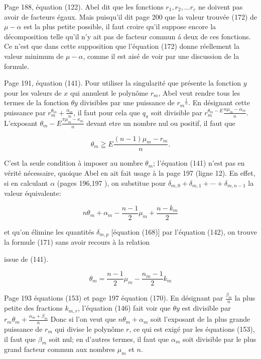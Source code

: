\documentclass{article}
\begin{document}
Page 188, équation (122). Abel dit que les fonctions \(r_{1}, r_{2}, \ldots r_{\varepsilon}\) ne doivent pas avoir de facteurs égaux. Mais puisqu'il dit page 200 que la valeur trouvée (172) de \(\mu-\alpha\) est la plus petite possible, il faut croire qu'il suppose encore la décomposition telle
qu'il n'y ait pas de facteur commun á deux de ces fonctions. Ce n'est que dans cette supposition que l'équation (172) donne réellement la valeur minimum de \(\mu-\alpha\), comme il est aisé de voir par une discussion de la formule.

Page 191, équation (141). Pour utiliser la singularité que présente la fonction \(y\) pour les valeurs de \(x\) qui annulent le polynôme \(r_{m}\), Abel veut rendre tous les termes de la fonction \(\theta y\) divisibles par une puissance de \(r_{m}{ }^{\frac{1}{n}}\). En désignant cette puissance par \(r_{m}^{\theta_{i n}}+\frac{\alpha_{m}}{n}\), il faut pour cela que \(q_{\pi}\) soit divisible par \(r_{m}^{\theta_{m}-E} \frac{n \mu_{m}-\alpha_{m}}{n}\). L'exposant \(\theta_{m}-E \frac{\pi \mu_{m}-\kappa_{m}}{n}\) devant etre un nombre nul ou positif, il faut que

\[
\theta_{m} \geqq E \frac{(n-1) \mu_{m}-r_{m}}{n} .
\]

C'est la seule condition à imposer au nombre \(\theta_{m}\); l'équation (141) n'est pas en vérité nécessaire, quoique Abel en ait fait usage à la page 197 (ligne 12). En effet, si en calculant \(\alpha\) (pages 196,197 ), on substitue pour \(\delta_{m, 0}+\delta_{m, 1}+\cdots+\delta_{m, n-1}\) la valeur équivalente:

\[
n \theta_{m}+\alpha_{m}-\frac{n-1}{2} \mu_{m}+\frac{n-k_{m}}{2}
\]

et qu'on élimine les quantités \(\delta_{m, p}\) [équation (168)] par l'équation (142), on trouve la formule (171) sans avoir recours à la relation

issue de (141).

\[
\theta_{m}=\frac{n-1}{2} \mu_{m}-\frac{n_{m}-1}{2} k_{m}
\]

Page 193 équations (153) et page 197 équation (170). En désignant par \(\frac{\beta_{m}}{n}\) la plus petite des fractions \(k_{m, r}\), l'équation (146) fait voir que \(\theta y\) est divisible par \(r_{m} \theta_{m}+\frac{\alpha_{m}+\beta_{m}}{n}\) Donc si l'on veut que \(n \theta_{m}+\alpha_{m}\) soit l'exposant de la plus grande puissance de \(r_{m}\) qui divise le polynôme \(r\), ce qui est exigé par les équations (153), il faut que \(\beta_{m}\) soit nul; en d'autres termes, il faut que \(\alpha_{m}\) soit divisible par le plus grand facteur commun aux nombres \(\mu_{m}\) et \(n\).
\end{document}
